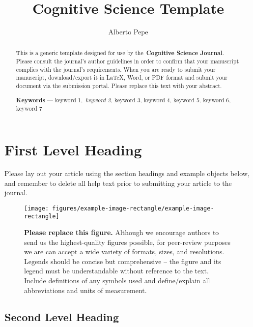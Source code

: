 \documentclass[alpha-refs]{wiley-article}
\title{Cognitive Science Template}
\author[1]{Alberto Pepe}
\affil[1]{Authorea}
\begin{document}
\maketitle
{}
\begin{abstract}
This is a generic template designed for use by the~\textbf{Cognitive
Science Journal}. Please consult the journal's author guidelines in
order to confirm that your manuscript complies with the journal's
requirements. When you are ready to submit your manuscript,
download/export it in LaTeX, Word, or PDF format and submit your
document via the submission portal. Please replace this text with your
abstract.

\textbf{Keywords} --- keyword 1,~\emph{keyword 2}, keyword 3, keyword 4,
keyword 5, keyword 6, keyword 7%
\end{abstract}%




\section*{First Level Heading}

{\label{707961}}

Please lay out your article using the section headings and example
objects below, and remember to delete all help text prior to submitting
your article to the journal.
\begin{figure}[h!]
\begin{center}
\texttt{[image: figures/example-image-rectangle/example-image-rectangle]}
\caption{{\textbf{Please replace this figure.} Although we encourage authors to
send us the highest-quality figures possible, for peer-review purposes
we are can accept a wide variety of formats, sizes, and resolutions.
Legends should be concise but comprehensive -- the figure and its legend
must be understandable without reference to the text. Include
definitions of any symbols used and define/explain all abbreviations and
units of measurement.
{\label{div-126281}}%
}}
\end{center}
\end{figure}

\par\null

\subsection*{Second Level Heading}\label{second-level-heading}
\end{document}
